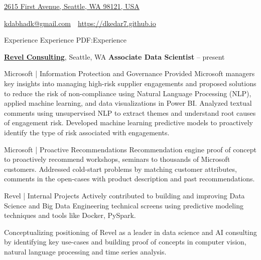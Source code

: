 \documentclass[letterpaper,MMMyyyy,nonstopmode]{simpleresumecv}
\newcommand{\CVAuthor}{Kedar Dabhadkar}
\newcommand{\CVWebpage}{https://dkedar7.github.io}
\begin{document}

\Title{\CVAuthor}

\begin{SubTitle}
\href{https://www.google.com/maps/place/2619+First+Avenue,+Seattle,+WA+98121,+USA}
{2615 First Avenue, Seattle, WA 98121, USA}
\par
\href{mailto:kdabhadk@gmail.com}
{kdabhadk@gmail.com}
\,\SubBulletSymbol\,
\href{\CVWebpage}
{\url{\CVWebpage}}
\end{SubTitle}

\begin{Body}

\Section
{Experience}
{Experience}
{PDF:Experience}

\Entry
\href{http://www.revelconsulting.com/}
{\textbf{Revel Consulting}},
Seattle, WA
\Entry
\textbf{Associate Data Scientist}
\hfill
{} --
present

\Gap
\BulletItem
Microsoft | Information Protection and Governance
\SubBulletItem
Provided Microsoft managers key insights into managing high-risk supplier engagements and proposed solutions to reduce the risk of non-compliance using Natural Language Processing (NLP), applied machine learning, and data visualizations in Power BI.
\SubBulletItem
Analyzed textual comments using unsupervised NLP to extract themes and understand root causes of engagement risk.
\SubBulletItem
Developed machine learning predictive models to proactively identify the type of risk associated with engagements.

\BulletItem
Microsoft | Proactive Recommendations
\SubBulletItem
Recommendation engine proof of concept to proactively recommend workshops, seminars to thousands of Microsoft customers.
\SubBulletItem
Addressed cold-start problems by matching customer attributes, comments in the open-cases with product description and past recommendations.

\BulletItem
Revel | Internal Projects
\SubBulletItem
Actively contributed to building and improving Data Science and Big Data Engineering technical screens using predictive modeling techniques and tools like Docker, PySpark.

\SubBulletItem
Conceptualizing positioning of Revel as a leader in data science and AI consulting by identifying key use-cases and building proof of concepts in computer vision, natural language processing and time series analysis.

\BigGap


\end{Body}
\end{document}
